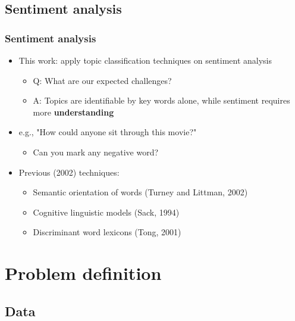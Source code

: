 \documentclass{beamer}
\begin{document}
\subsection{Sentiment analysis}

\begin{frame}
	\frametitle{Sentiment analysis}
	\begin{itemize}
	\item This work: apply topic classification techniques on sentiment analysis
	\begin{itemize}
		\item Q: What are our expected challenges?
		\pause
		\item A: Topics are identifiable by key words alone, while sentiment requires more \textbf{understanding}
	\end{itemize}
	\end{itemize}
	\pause
	\begin{itemize}
		\item e.g., "How could anyone sit through this movie?"
		\begin{itemize}
			\item Can you mark  any negative word?
		\end{itemize}
	
	\end{itemize}
	\pause
	
	\begin{itemize}
	\item Previous (2002) techniques:
	\begin{itemize}
		\item Semantic orientation of words (Turney and Littman, 2002)
		\item Cognitive linguistic models (Sack, 1994)
		\item Discriminant word lexicons (Tong, 2001)
	
	\end{itemize}
	\end{itemize}
	

\end{frame}

\section{Problem definition}
\subsection{Data}
\end{document}
